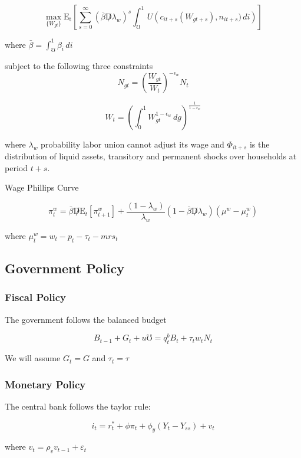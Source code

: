 \documentclass[titlepage]{\econtex}\providecommand{\texname}{BufferStockTheory}
\begin{document}
$$ \max_{\{W_{gt}\}} \mathrm{E_{t}}\left[\sum_{s=0}^{\infty} (\bar{\beta} \not D \lambda_{w})^{s} \int_{\mho}^{1}  U\left (c_{it+s}(W_{gt+s}), n_{i t+s}) \, di \right)\right] $$

where $\bar{\beta} = \int_{\mho}^{1} \beta_{i} \, di$

subject to the following three constraints $$ N_{gt} = \left(\frac{W_{gt}}{W_{t}}\right)^{-\epsilon_{w}} N_{t} $$

$$ W_{t} = \left(\int_{0}^{1} W_{gt}^{1-\epsilon_{w}}\,dg\right)^{\frac{1}{1-\epsilon_{w}}}$$

where $\lambda_{w}$ probability labor union cannot adjust its wage and $\Phi_{it+s}$ is the distribution of  liquid assets, transitory and permanent shocks over households at period $t+s$.


Wage Phillips Curve


$$ \pi_{t}^{w} =   \bar{\beta} \not D  \mathrm{E}_{t} \left[ \pi_{t+1}^{w}\right] + \frac{(1-\lambda_{w})}{\lambda_{w}} (1- \bar{\beta} \not D \lambda_{w}) (\mu^{w} - \mu_{t}^{w})$$

where $\mu_{t}^{w} = w_{t} - p_{t} - \tau_{t} - mrs_{t}$


\hypertarget{Government Policy}{}
\subsection{Government Policy}



\hypertarget{Fiscal Policy}{}
\subsubsection{Fiscal Policy}

The government follows the balanced budget

$$ B_{t-1} + G_{t} + \mathit{u} \mho =   q^{b}_{t} B_{t} +  \tau_{t} w_{t} N_{t} $$ 

We will assume $ G_{t} = G$ and $ \tau_{t} = \tau$

\hypertarget{Monetary Policy}{}
\subsubsection{Monetary Policy}


The central bank follows the taylor rule: 

$$i_{t} = r_{t}^{*} +\phi \pi_{t} + \phi_{y} (Y_{t} - Y_{ss}) + v_{t}$$

where $v_{t} = \rho_{v} v_{t-1} +\varepsilon_{t}$
\end{document}
